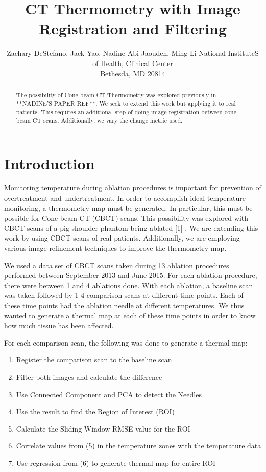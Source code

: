 \documentclass[]{spie}  %
\title{CT Thermometry with Image Registration and Filtering}
\author{Zachary DeStefano\supit{a}, Jack Yao\supit{a}, Nadine Abi-Jaoudeh\supit{a}, Ming Li\supit{a}
\skiplinehalf
\supit{a}National InstituteS of Health, Clinical Center\\Bethesda, MD 20814
}
\begin{document}
 
  \maketitle 

\begin{abstract}
The possibility of Cone-beam CT Thermometry was explored previously in **NADINE'S PAPER REF**. We seek to extend this work but applying it to real patients. This requires an additional step of doing image registration between cone-beam CT scans. Additionally, we vary the change metric used.  
\end{abstract}



\section{Introduction}
\label{sec:intro}  %

Monitoring temperature during ablation procedures is important for prevention of overtreatment and undertreatment. In order to accomplish ideal temperature monitoring, a thermometry map must be generated.  In particular, this must be possible for Cone-beam CT (CBCT) scans. This possibility was explored with CBCT scans of a pig shoulder phantom being ablated [1] . We are extending this work by using CBCT scans of real patients. Additionally, we are employing various image refinement techniques to improve the thermometry map. 

We used a data set of CBCT scans taken during 13 ablation procedures performed between September 2013 and June 2015. For each ablation procedure, there were between 1 and 4 ablations done. With each ablation, a baseline scan was taken followed by 1-4 comparison scans at different time points. Each of these time points had the ablation needle at different temperatures. We thus wanted to generate a thermal map at each of these time points in order to know how much tissue has been affected. 

For each comparison scan, the following was done to generate a thermal map:
\begin{enumerate}
\item Register the comparison scan to the baseline scan
\item Filter both images and calculate the difference
\item Use Connected Component and PCA to detect the Needles
\item Use the result to find the Region of Interest (ROI)
\item Calculate the Sliding Window RMSE value for the ROI
\item Correlate values from (5) in the temperature zones with the temperature data
\item Use regression from (6) to generate thermal map for entire ROI
\end{enumerate}
\end{document}
